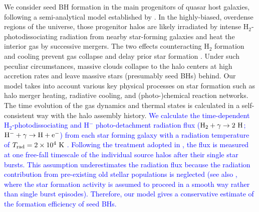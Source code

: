 \documentclass[twocolumn, twocolappendix]{aastex63}
\newcommand{\blue}[1]{\textcolor{blue}{ #1}}
\begin{document}
\begin{CJK*}{UTF8}{gbsn}
We consider seed BH formation in the main progenitors of quasar host galaxies, following a semi-analytical model established by \citet{2021ApJ...917...60L}.
In the highly-biased, overdense regions of the universe, those progenitor halos are likely irradiated by intense H$_2$-photodissociating radiation 
from nearby star-forming galaxies and heat the interior gas by successive mergers. 
The two effects counteracting H$_2$ formation and cooling prevent gas collapse and delay prior star formation \citep[e.g.,][]{2014MNRAS.445..107V,2019Natur.566...85W}.
Under such peculiar circumstances, massive clouds collapse to the halo centers at high accretion rates and leave massive stars (presumably seed BHs) behind.
Our model takes into account various key physical processes on star formation such as halo merger heating, radiative cooling, and
(photo-)chemical reaction networks.
The time evolution of the gas dynamics and thermal states is calculated in a self-consistent way with the halo assembly history.
\blue{
We calculate the time-dependent H$_2$-photodissociating and H$^-$ photo-detachment radiation flux (${\rm H}_2+\gamma \rightarrow 2~{\rm H}$; 
${\rm H}^-+\gamma \rightarrow {\rm H}+{\rm e}^-$) from each star forming galaxy with a radiation temperature of $T_{\rm rad}=2\times 10^4~{\rm K}$ \citep{2014MNRAS.445..544S,2015MNRAS.450.4350I}.
Following the treatment adopted in \citet{2014MNRAS.442.2036D}, the flux is measured at one free-fall timescale of the individual source halos after their single star bursts.
This assumption underestimates the radiation flux because the radiation contribution from pre-existing old stellar populations is neglected
(see also \citealt{2021MNRAS.503.5046L}, where the star formation activity is assumed to proceed in a smooth way rather than single burst episodes).
Therefore, our model gives a conservative estimate of the formation efficiency of seed BHs.
}



\end{CJK*}
\end{document}
